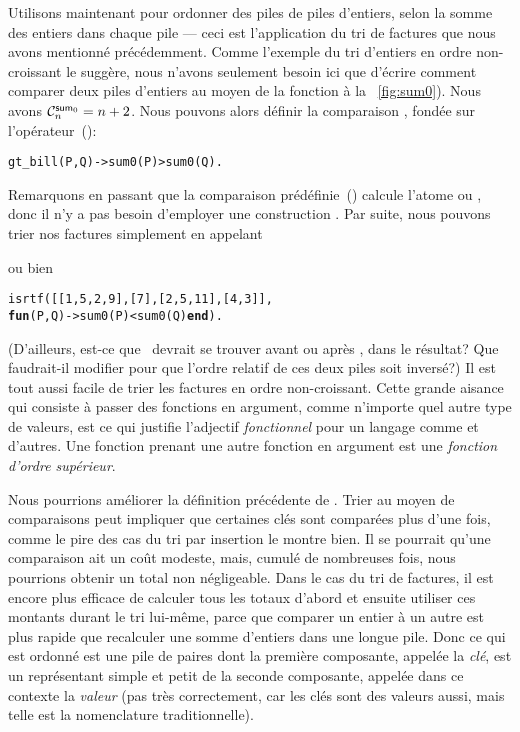 Utilisons maintenant  pour ordonner des piles de
piles d'entiers, selon la somme des entiers dans chaque pile --- ceci
est l'application du tri de factures que nous avons mentionné
précédemment. Comme l'exemple du tri d'entiers en ordre non-croissant
le suggère, nous n'avons seulement besoin ici que d'écrire comment
comparer deux piles d'entiers au moyen de la fonction 
à la \fig~\vref{fig:sum0}). Nous avons \(\C{\fun{sum}_0}{n} = n +
2\). Nous pouvons alors définir la comparaison ,
fondée sur l'opérateur~(\erlcode{>}):
\begin{alltt}
gt_bill(P,Q) -> sum0(P) > sum0(Q).
\end{alltt}
Remarquons en passant que la comparaison prédéfinie~(\erlcode{>})
calcule l'atome  ou , donc il n'y a pas
besoin d'employer une construction . Par suite, nous
pouvons trier nos factures simplement en appelant
\begin{center}
\end{center}
ou bien
\begin{alltt}
      isrtf([[1,5,2,9],[7],[2,5,11],[4,3]],
            \textbf{fun}(P,Q) -> sum0(P) < sum0(Q) \textbf{end}).
\end{alltt}
(D'ailleurs, est-ce que~\erlcode{[7]} devrait se trouver avant ou
après \erlcode{[4,3]}, dans le résultat? Que faudrait-il modifier pour
que l'ordre relatif de ces deux piles soit inversé?) Il est tout aussi
facile de trier les factures en ordre non-croissant. Cette grande
aisance qui consiste à passer des fonctions en argument, comme
n'importe quel autre type de valeurs, est ce qui justifie l'adjectif
\emph{fonctionnel} pour un langage comme \Erlang et d'autres. Une
fonction prenant une autre fonction en argument est une \emph{fonction
  d'ordre supérieur}.

\label{sorted_association_lists} 

Nous pourrions améliorer la définition précédente de
. Trier au moyen de comparaisons peut impliquer que
certaines clés sont comparées plus d'une fois, comme le pire des cas
du tri par insertion le montre bien. Il se pourrait qu'une comparaison
ait un coût modeste, mais, cumulé de nombreuses fois, nous pourrions
obtenir un total non négligeable. Dans le cas du tri de factures, il
est encore plus efficace de calculer tous les totaux d'abord et
ensuite utiliser ces montants durant le tri lui-même, parce que
comparer un entier à un autre est plus rapide que recalculer une somme
d'entiers dans une longue pile. Donc ce qui est ordonné est une pile
de paires dont la première composante, appelée la \emph{clé}, est un
représentant simple et petit de la seconde composante, appelée dans ce
contexte la \emph{valeur} (pas très correctement, car les clés sont
des valeurs \Erlang aussi, mais telle est la nomenclature
traditionnelle).

